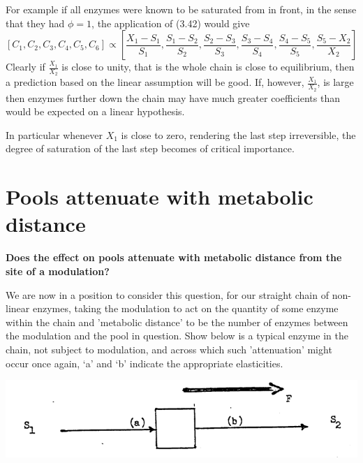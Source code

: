 For example if all enzymes were known to be saturated from in front, in the sense that they had $\phi=1$, the application of (3.42) would give
%
$$
\left[C_1, C_2, C_3, C_4, C_5, C_6\right] \propto\left[\frac{X_1-S_1}{S_1}, \frac{S_1-S_2}{S_2}, \frac{S_2-S_3}{S_3}, \frac{S_3-S_4}{S_4}, \frac{S_4-S_5}{S_5}, \frac{S_5-X_2}{X_2}\right]
$$
%
Clearly if $\frac{X_1}{X_2}$ is close to unity, that is the whole chain is close to equilibrium, then a prediction based on the linear assumption will be good. If, however, $\frac{X_1}{X_2}$, is large then enzymes further down the chain may have much greater coefficients than would be expected on a linear hypothesis.

In particular whenever $X_1$ is close to zero, rendering the last step irreversible, the degree of saturation of the last step becomes of critical importance.

\section{Pools attenuate with metabolic distance}

{\bf Does the effect on pools attenuate with metabolic distance from the site of a modulation?}

We are now in a position to consider this question, for our straight chain of non-linear enzymes, taking the modulation to act on the quantity of some enzyme within the chain and 'metabolic distance' to be the number of enzymes between the modulation and the pool in question. Show below is a typical enzyme in the chain, not subject to modulation, and across which such 'attenuation' might occur once again, `a' and `b' indicate the appropriate elasticities.

\begin{center}
\includegraphics[scale=0.8]{figure3_Chain1.png}
\end{center}

